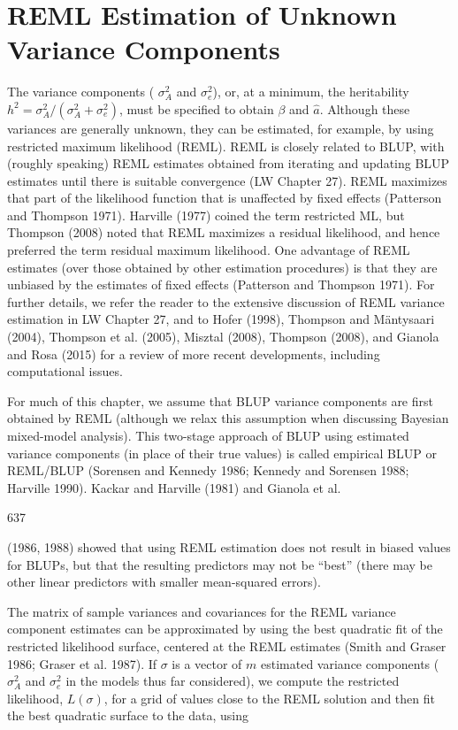 \documentclass{article}
\begin{document}
\section{REML Estimation of Unknown Variance Components}
The variance components ( $ \sigma_A^2 $ and  $ \sigma_e^2 $), or, at a minimum, the heritability  $ h^2 = \sigma_A^2 / (\sigma_A^2 + \sigma_e^2) $, must be specified to obtain  $ \beta $ and  $ \hat{a} $. Although these variances are generally unknown, they can be estimated, for example, by using restricted maximum likelihood (REML). REML is closely related to BLUP, with (roughly speaking) REML estimates obtained from iterating and updating BLUP estimates until there is suitable convergence (LW Chapter 27). REML maximizes that part of the likelihood function that is unaffected by fixed effects (Patterson and Thompson 1971). Harville (1977) coined the term restricted ML, but Thompson (2008) noted that REML maximizes a residual likelihood, and hence preferred the term residual maximum likelihood. One advantage of REML estimates (over those obtained by other estimation procedures) is that they are unbiased by the estimates of fixed effects (Patterson and Thompson 1971). For further details, we refer the reader to the extensive discussion of REML variance estimation in LW Chapter 27, and to Hofer (1998), Thompson and Mäntysaari (2004), Thompson et al. (2005), Misztal (2008), Thompson (2008), and Gianola and Rosa (2015) for a review of more recent developments, including computational issues.

For much of this chapter, we assume that BLUP variance components are first obtained by REML (although we relax this assumption when discussing Bayesian mixed-model analysis). This two-stage approach of BLUP using estimated variance components (in place of their true values) is called empirical BLUP or REML/BLUP (Sorensen and Kennedy 1986; Kennedy and Sorensen 1988; Harville 1990). Kackar and Harville (1981) and Gianola et al.

637

(1986, 1988) showed that using REML estimation does not result in biased values for BLUPs, but that the resulting predictors may not be “best” (there may be other linear predictors with smaller mean-squared errors).

The matrix of sample variances and covariances for the REML variance component estimates can be approximated by using the best quadratic fit of the restricted likelihood surface, centered at the REML estimates (Smith and Graser 1986; Graser et al. 1987). If  $ \sigma $ is a vector of  $ m $ estimated variance components ( $ \sigma_A^2 $ and  $ \sigma_e^2 $ in the models thus far considered), we compute the restricted likelihood,  $ L(\sigma) $, for a grid of values close to the REML solution and then fit the best quadratic surface to the data, using
\end{document}
